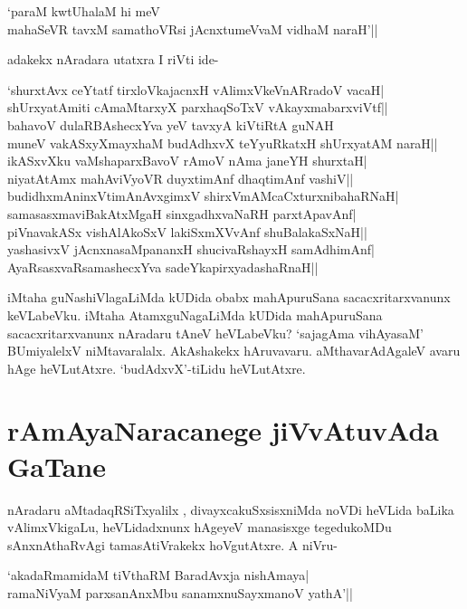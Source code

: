 \begin{shloka} 
`paraM kwtUhalaM hi meV\label{163}\\ 
mahaSeVR tavxM samathoVR\s si jAcnxtumeVvaM vidhaM naraH'|| 
\end{shloka} 

adakekx nAradara utatxra I riVti ide- 

\begin{shloka}
`shurxtAvx ceYtatf tirxloVkajacnxH vAlimxVkeVnARradoV vacaH|\label{163d}\\ 
shUrxyatAmiti cAmaMtarxyX parxhaqSoTxV vAkayxmabarxviVtf||\\ 
bahavoV dulaRBAshecxYva yeV tavxyA kiVtiRtA guNAH\label{163a}\\ 
muneV vakASxyXmayxhaM budAdhxvX teYyuRkatxH shUrxyatAM naraH||\\ 
ikASxvXku vaMshaparxBavoV rAmoV nAma janeYH shurxtaH|\label{163aa}\\ 
niyatAtAmx mahAviVyoVR duyxtimAnf dhaqtimAnf vashiV||\\ 
budidhxmAninxVtimAnAvxgimxV shirxVmAMcaCxturxnibahaRNaH|\\ 
samasasxmaviBakAtxMgaH sinxgadhxvaNaRH parxtApavAnf|\\ 
piVnavakASx vishAlAkoSxV lakiSxmXVvAnf shuBalakaSxNaH||\\ 
yashasivxV jAcnxnasaMpananxH shucivaRshayxH samAdhimAnf|\\ 
AyaRsasxvaRsamashecxYva sadeYkapirxyadashaRnaH||
\end{shloka} 

iMtaha guNashiVlagaLiMda kUDida obabx mahApuruSana sacacxritarxvanunx keVLabeVku. iMtaha AtamxguNagaLiMda kUDida mahApuruSana sacacxritarxvanunx nAradaru tAneV heVLabeVku? `sajagAma vihAyasaM'\label{163c} BUmiyalelxV niMtavaralalx. AkAshakekx hAruvavaru. aMthavarAdAgaleV avaru hAge heVLutAtxre. `budAdxvX'-tiLidu heVLutAtxre. 

\section*{rAmAyaNaracanege jiVvAtuvAda GaTane} 

nAradaru aMtadaqRSiTxyalilx , divayxcakuSxsisxniMda noVDi heVLida baLika vAlimxVkigaLu, heVLidadxnunx hAgeyeV manasisxge tegedukoMDu sAnxnAthaRvAgi tamasAtiVrakekx hoVgutAtxre. A niVru- 

\begin{shloka} 
`akadaRmamidaM tiVthaRM BaradAvxja nishAmaya|\label{164}\\ 
ramaNiVyaM parxsanAnxMbu sanamxnuSayxmanoV yathA'||
\end{shloka} 

